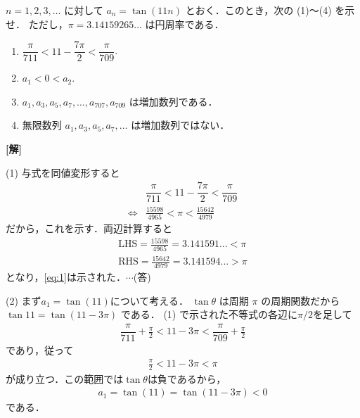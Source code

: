 \documentclass[a4paper,10pt]{ltjsarticle}
\begin{document}
\begin{oframed}
  $n=1,2,3,\dots$ に対して $a_n = \tan(11n)$ とおく．このとき，次の (1)～(4) を示せ．
  ただし，$\pi = 3.14159265\dots$ は円周率である．

  \begin{enumerate}
    \item $\dfrac{\pi}{711} < 11 - \dfrac{7\pi}{2} < \dfrac{\pi}{709}$.
    \item $a_1 < 0 < a_2$.
    \item $a_1, a_3, a_5, a_7, \dots, a_{707}, a_{709}$ は増加数列である．
    \item 無限数列 $a_1, a_3, a_5, a_7, \dots$ は増加数列ではない．
  \end{enumerate}
\end{oframed}
\setlength{\columnseprule}{0.4pt}
\begin{multicols}{2}
  {\bf[解]}

  (1) 与式を同値変形すると
  \begin{align}
     & \dfrac{\pi}{711} < 11 - \dfrac{7\pi}{2} < \dfrac{\pi}{709} \nonumber \\
    \iff
     & \frac{15598}{4965} < \pi < \frac{15642}{4979}\label{eq:1}
  \end{align}
  だから，これを示す．両辺計算すると
  \begin{align*}
    \mathrm{LHS} = \frac{15598}{4965} = 3.141591... < \pi \\
    \mathrm{RHS} = \frac{15642}{4979} = 3.141594... > \pi
  \end{align*}
  となり，\cref{eq:1}は示された．$\cdots$(答)


  \vspace{10pt}
  (2)
  まず$a_1=\tan(11)$について考える．
  $\tan \theta$ は周期 $\pi$ の周期関数だから $\tan 11 = \tan (11-3\pi)$ である．
  (1) で示された不等式の各辺に$\pi/2$を足して
  \begin{align*}
    \dfrac{\pi}{711} + \frac{\pi}{2} < 11 - 3\pi < \dfrac{\pi}{709} + \frac{\pi}{2}
  \end{align*}
  であり，従って
  \begin{align*}
    \frac{\pi}{2} < 11 - 3\pi < \pi
  \end{align*}
  が成り立つ．この範囲では$\tan\theta$は負であるから，
  \begin{align}
    a_1 = \tan(11) = \tan\left(11-3\pi\right) < 0 \label{eq:2}
  \end{align}
  である．


\end{multicols}
\end{document}
